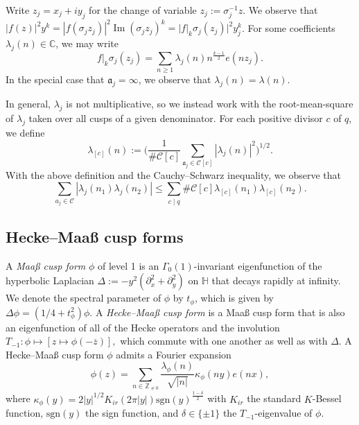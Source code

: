 \documentclass[12pt,reqno]{amsart}
\theoremstyle{remark}
\newcommand{\h}{\mathbb{H}}
\DeclareMathOperator{\Imag}{Im}
\numberwithin{equation}{section}
\begin{document}
    Write $z_j = x_j + iy_j$ for the change of variable $z_j := \sigma_j^{-1}z$.  We observe that $|f(z)|^2y^k = |f(\sigma_jz_j)|^2\Imag(\sigma_jz_j)^k = |f|_k\sigma_j(z_j)|^2 y_j^k$. For some coefficients $\lambda_j(n) \in \mathbb{C}$, we may write
        \begin{equation}\label{eq:fourier-zj}
		f|_k\sigma_j(z_j) = \sum_{n \ge 1} \lambda_j(n)n^{\frac{k-1}{2}}e(nz_j).
	\end{equation}
    In the special case that $\mathfrak{a}_j = \infty$, we observe that $\lambda_j(n) = \lambda(n).$ 

	
	In general, $\lambda_j$ is not multiplicative, so we instead work with the root-mean-square of $\lambda_j$ taken over all cusps of a given denominator. For each positive divisor $c$ of $q$, we define
	\begin{equation}\label{eq:lambdac}
		\lambda_{[c]}(n) := \Big(\frac{1}{\#\mathcal{C}[c]}\sum_{\mathfrak{a}_j \in \mathcal{C}[c]} |\lambda_j(n)|^2 \Big)^{1/2}.
	\end{equation}
   With the above definition and the Cauchy--Schwarz inequality, we observe that
   \begin{equation}\label{eq:regrouping}
		\sum_{a_j \in \mathcal{C}} |\lambda_j(n_1)\lambda_j(n_2)|\le \sum_{c\mid q}\#\mathcal{C}[c]\lambda_{[c]}(n_1)\lambda_{[c]}(n_2). 
		\end{equation}

    
	\subsection{Hecke--Maa{\ss} cusp forms}\label{subsec:maasscuspforms}
	A \textit{Maa{\ss} cusp form} $\phi$ of level 1 is an $\Gamma_0(1)$-invariant eigenfunction of the hyperbolic Laplacian $\Delta := -y^{2}(\partial_x^2 + \partial_y^2)$ on $\h$ that decays rapidly at infinity. We denote the spectral parameter of $\phi$ by $t_\phi$, which is given by $\Delta \phi = (1/4+t_\phi^2)\phi$.
    A \textit{Hecke--Maa{\ss} cusp form} is a Maa{\ss} cusp form that is also an eigenfunction of all of the Hecke operators and the involution $T_{-1}: \phi \mapsto [z \mapsto \phi(-\overline{z})],$ which commute with one another as well as with $\Delta$. A Hecke--Maa{\ss} cusp form $\phi$ admits a Fourier expansion
    \[
        \phi(z) = \sum_{n \in \mathbb{Z}_{\neq 0}} \frac{\lambda_{\phi}(n)}{\sqrt{|n|}} \kappa_{\phi}(ny)e(nx),
    \]
    where $\kappa_{\phi}(y) =2 |y|^{1/2}K_{ir}(2\pi|y|)\mathrm{sgn}(y)^{\frac{1-\delta}{2}}$ with $K_{ir}$ the standard $K$-Bessel function, $\mathrm{sgn}(y)$ the sign function, and $\delta \in \{\pm 1\}$ the $T_{-1}$-eigenvalue of $\phi$. 
    
\end{document}
